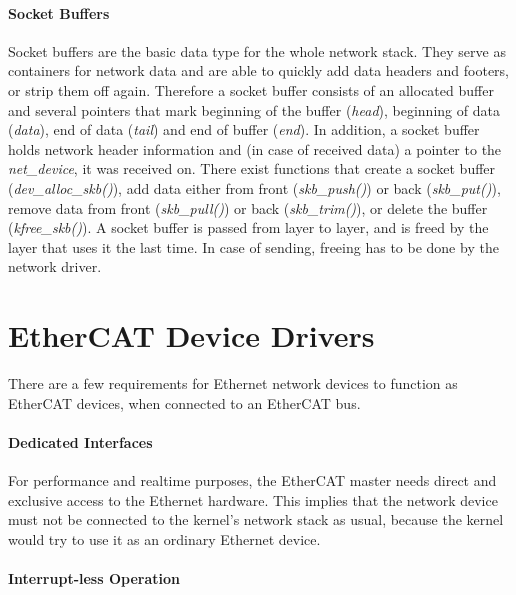 \documentclass[a4paper,12pt,BCOR6mm,bibtotoc,idxtotoc]{scrbook}
\begin{document}
\paragraph{Socket Buffers}

Socket buffers are the basic data type for the whole network stack.
They serve as containers for network data and are able to quickly add
data headers and footers, or strip them off again. Therefore a socket
buffer consists of an allocated buffer and several pointers that mark
beginning of the buffer (\textit{head}), beginning of data
(\textit{data}), end of data (\textit{tail}) and end of buffer
(\textit{end}). In addition, a socket buffer holds network header
information and (in case of received data) a pointer to the
\textit{net\_device}, it was received on. There exist functions that
create a socket buffer (\textit{dev\_alloc\_skb()}), add data either
from front (\textit{skb\_push()}) or back (\textit{skb\_put()}),
remove data from front (\textit{skb\_pull()}) or back
(\textit{skb\_trim()}), or delete the buffer (\textit{kfree\_skb()}).
A socket buffer is passed from layer to layer, and is freed by the
layer that uses it the last time. In case of sending, freeing has to
be done by the network driver.


\section{EtherCAT Device Drivers}
\label{sec:requirements}

There are a few requirements for Ethernet network devices to function
as EtherCAT devices, when connected to an EtherCAT bus.

\paragraph{Dedicated Interfaces}

For performance and realtime purposes, the EtherCAT master needs
direct and exclusive access to the Ethernet hardware. This implies
that the network device must not be connected to the kernel's network
stack as usual, because the kernel would try to use it as an ordinary
Ethernet device.

\paragraph{Interrupt-less Operation}
\end{document}
